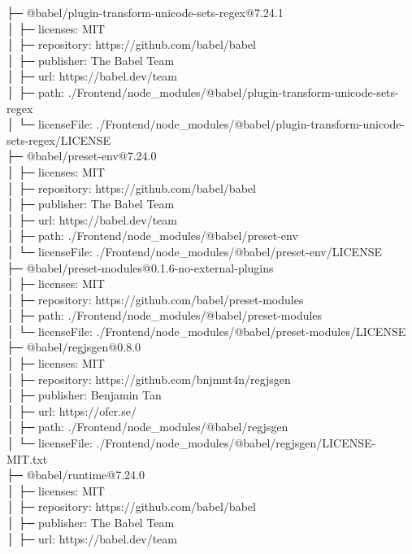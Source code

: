 ├─ @babel/plugin-transform-unicode-sets-regex@7.24.1\\
│  ├─ licenses: MIT\\
│  ├─ repository: https://github.com/babel/babel\\
│  ├─ publisher: The Babel Team\\
│  ├─ url: https://babel.dev/team\\
│  ├─ path: ./Frontend/node\_modules/@babel/plugin-transform-unicode-sets-regex\\
│  └─ licenseFile: ./Frontend/node\_modules/@babel/plugin-transform-unicode-sets-regex/LICENSE\\
├─ @babel/preset-env@7.24.0\\
│  ├─ licenses: MIT\\
│  ├─ repository: https://github.com/babel/babel\\
│  ├─ publisher: The Babel Team\\
│  ├─ url: https://babel.dev/team\\
│  ├─ path: ./Frontend/node\_modules/@babel/preset-env\\
│  └─ licenseFile: ./Frontend/node\_modules/@babel/preset-env/LICENSE\\
├─ @babel/preset-modules@0.1.6-no-external-plugins\\
│  ├─ licenses: MIT\\
│  ├─ repository: https://github.com/babel/preset-modules\\
│  ├─ path: ./Frontend/node\_modules/@babel/preset-modules\\
│  └─ licenseFile: ./Frontend/node\_modules/@babel/preset-modules/LICENSE\\
├─ @babel/regjsgen@0.8.0\\
│  ├─ licenses: MIT\\
│  ├─ repository: https://github.com/bnjmnt4n/regjsgen\\
│  ├─ publisher: Benjamin Tan\\
│  ├─ url: https://ofcr.se/\\
│  ├─ path: ./Frontend/node\_modules/@babel/regjsgen\\
│  └─ licenseFile: ./Frontend/node\_modules/@babel/regjsgen/LICENSE-MIT.txt\\
├─ @babel/runtime@7.24.0\\
│  ├─ licenses: MIT\\
│  ├─ repository: https://github.com/babel/babel\\
│  ├─ publisher: The Babel Team\\
│  ├─ url: https://babel.dev/team\\
